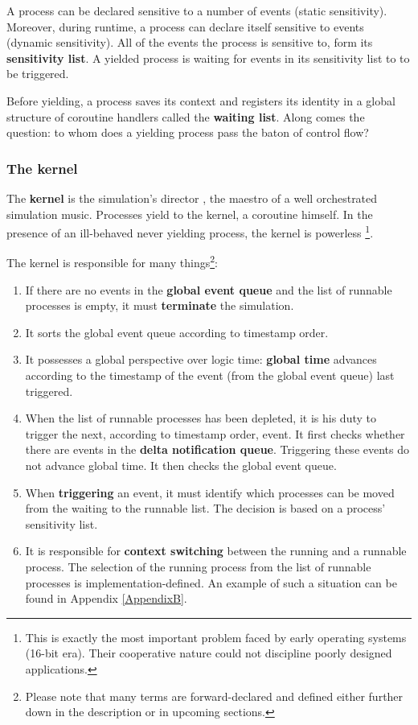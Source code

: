 \documentclass[11pt]{article}
\begin{document}
A process can be declared sensitive to a number of events (static sensitivity).
Moreover, during runtime, a process can declare itself sensitive to events (dynamic sensitivity).
All of the events the process is sensitive to, form its \textbf{sensitivity list}.
A yielded process is waiting for events in its sensitivity list to to be triggered.

Before yielding, a process saves its context and registers its identity in a global structure of coroutine handlers called the \textbf{waiting list}.
Along comes the question: to whom does a yielding process pass the baton of control flow?

\subsubsection{The kernel}
\label{sec:orgb7ca01f}
The \textbf{kernel} is the simulation's director \cite{Editor2014}, the maestro of a well orchestrated simulation music.
Processes yield to the kernel, a coroutine himself.
In the presence of an ill-behaved never yielding process, the kernel is powerless \footnote{This is exactly the most important problem faced by early operating systems (16-bit era). 
Their cooperative nature could not discipline poorly designed applications.}.

The kernel is responsible for many things\footnote{Please note that many terms are forward-declared and defined either further down in the description or in upcoming sections.}:
\begin{enumerate}
\item If there are no events in the \textbf{global event queue} and the list of runnable processes is empty, it must \textbf{terminate} the simulation.
\item It sorts the global event queue according to timestamp order.
\item It possesses a global perspective over logic time:
\textbf{global time} advances according to the timestamp of the event (from the global event queue) last triggered.
\item When the list of runnable processes has been depleted, it is his duty to trigger the next, according to timestamp order, event.
It first checks whether there are events in the \textbf{delta notification queue}. 
Triggering these events do not advance global time.
It then checks the global event queue.
\item When \textbf{triggering} an event, it must identify which processes can be moved from the waiting to the runnable list. 
The decision is based on a process' sensitivity list.
\item It is responsible for \textbf{context switching} between the running and a runnable process. 
The selection of the running process from the list of runnable processes is implementation-defined.
An example of such a situation can be found in Appendix \ref{AppendixB}.
\end{enumerate}
\end{document}
